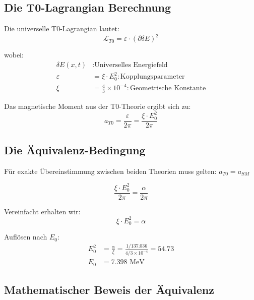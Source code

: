 \documentclass[12pt,a4paper]{article}
\numberwithin{equation}{section}
\newcommand{\xipar}{\xi}
\newcommand{\calL}{\mathcal{L}}
\begin{document}
	\subsection{Die T0-Lagrangian Berechnung}
	
	Die universelle T0-Lagrangian lautet:
	\begin{equation}
		\label{eq:t0_lagrangian}
		\calL_{T0} = \varepsilon \cdot (\partial \delta E)^2
	\end{equation}
	
	wobei:
	\begin{align}
		\delta E(x,t) &: \text{Universelles Energiefeld}\\
		\varepsilon &= \xipar \cdot E_0^2 : \text{Kopplungsparameter}\\
		\xipar &= \frac{4}{3} \times 10^{-4} : \text{Geometrische Konstante}
	\end{align}
	
	Das magnetische Moment aus der T0-Theorie ergibt sich zu:
	\begin{equation}
		\label{eq:magnetic_moment_t0}
		a_{T0} = \frac{\varepsilon}{2\pi} = \frac{\xipar \cdot E_0^2}{2\pi}
	\end{equation}
	
	\subsection{Die Äquivalenz-Bedingung}
	
	Für exakte Übereinstimmung zwischen beiden Theorien muss gelten: $a_{T0} = a_{SM}$
	
	\begin{equation}
		\label{eq:equivalence_condition}
		\frac{\xipar \cdot E_0^2}{2\pi} = \frac{\alpha}{2\pi}
	\end{equation}
	
	Vereinfacht erhalten wir:
	\begin{equation}
		\label{eq:simplified_equivalence}
		\xipar \cdot E_0^2 = \alpha
	\end{equation}
	
	Auflösen nach $E_0$:
	\begin{align}
		E_0^2 &= \frac{\alpha}{\xipar} = \frac{1/137.036}{4/3 \times 10^{-4}} = 54.73\\
		E_0 &= 7.398 \text{ MeV}
	\end{align}
	
	\subsection{Mathematischer Beweis der Äquivalenz}
	
\end{document}
